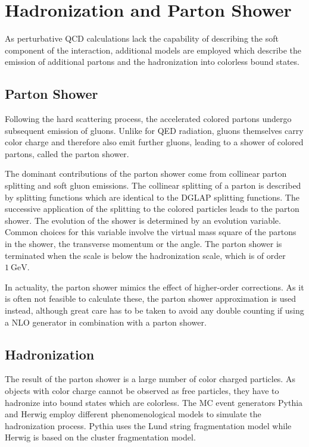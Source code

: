 \section{Hadronization and Parton Shower}

As perturbative QCD calculations lack the capability of describing the
soft component of the interaction, additional models are employed which describe
the emission of additional partons and the hadronization into colorless bound
states. 

\subsection{Parton Shower}

Following the hard scattering process, the accelerated colored partons undergo
subsequent emission of gluons. Unlike for QED radiation, gluons themselves carry
color charge and therefore also emit further gluons, leading to a shower of
colored partons, called the parton shower.

The dominant contributions of the parton shower  come from collinear parton
splitting and soft gluon emissions. The collinear splitting of a parton is
described by splitting functions which are identical to the DGLAP splitting
functions. The successive application of the splitting to the colored particles
leads to the parton shower. The evolution of the shower is determined by an
evolution variable. Common choices for this variable  involve the virtual mass square of the
partons in the shower, the transverse momentum or the angle. The parton shower
is terminated when the scale is below the hadronization scale, which is of order
$\SI{1}{\GeV}$.

In actuality, the parton shower mimics the effect of higher-order corrections. As
it is often not feasible to calculate these, the parton shower approximation is
used instead, although great care has to be taken to avoid any double counting if
using a NLO generator in combination with a parton shower.

\subsection{Hadronization}

The result of the parton shower is a large number of color charged particles. As
objects with color charge cannot be observed as free particles, they have to
hadronize into bound states which are colorless. The MC event generators Pythia
and Herwig employ different phenomenological models to simulate the
hadronization process. Pythia uses the Lund string fragmentation model while
Herwig is based on the cluster fragmentation model.

